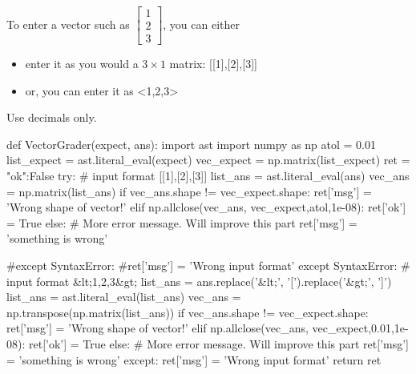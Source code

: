 To enter a vector such as $\left[\begin{array}{c} 1 \\ 2  \\ 3 \end{array} \right]$, you can either 
\begin{itemize}
\item
enter it as 
you would a $3\times 1$ matrix: [[1],[2],[3]]  
\item
or, you can enter it as <1,2,3>
\end{itemize}

Use decimals only.  

\begin{edXscript}
def VectorGrader(expect, ans):
	import ast
	import numpy as np 
  	atol = 0.01
	list_expect = ast.literal_eval(expect)
	vec_expect = np.matrix(list_expect)
  	ret = {"ok":False}
	try:
  		# input format [[1],[2],[3]]
		list_ans = ast.literal_eval(ans)
		vec_ans = np.matrix(list_ans)
  		if vec_ans.shape != vec_expect.shape:
  			ret['msg'] = 'Wrong shape of vector!'
  		elif np.allclose(vec_ans, vec_expect,atol,1e-08):
  			ret['ok'] = True
  		else:
  		# More error message. Will improve this part
  			ret['msg'] = 'something is wrong' 
  			
	#except SyntaxError:
		#ret['msg'] = 'Wrong input format'
	except SyntaxError:
  		# input format &lt;1,2,3&gt;
		list_ans = ans.replace('&lt;', '[').replace('&gt;', ']')
		list_ans = ast.literal_eval(list_ans)
		vec_ans = np.transpose(np.matrix(list_ans))
  		if vec_ans.shape != vec_expect.shape:
  			ret['msg'] = 'Wrong shape of vector!'
  		elif np.allclose(vec_ans, vec_expect,0.01,1e-08):
  			ret['ok'] = True
  		else:
    		# More error message. Will improve this part
  			ret['msg'] = 'something is wrong' 
  	except:
  		ret['msg'] = 'Wrong input format'
  	return ret
	
  
\end{edXscript}
